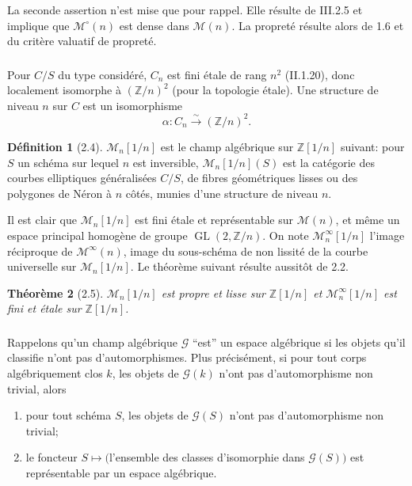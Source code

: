 \documentclass[11pt,a4paper]{amsart}
\theoremstyle{plain}
\newtheorem{theorem}{Th\'eor\`eme}[section]
\theoremstyle{definition}
\newtheorem{definition}[theorem]{D\'efinition}
\DeclareMathOperator{\Gl}{GL}
\newcommand{\CG}{\mathcal{G}}
\newcommand{\CM}{\mathcal{M}}
\newcommand{\mll}{\mathcal{M}}
\newcommand{\ZZ}{\mathbb{Z}}
\begin{document}
La seconde assertion n'est mise que pour rappel. Elle r\'esulte de III.2.5 et implique que $\mll^{\circ}(n)$ est dense dans $\mll(n)$. La propret\'e r\'esulte alors de 1.6 et du crit\`ere valuatif de propret\'e.

\subsubsection{}
Pour $C/S$ du type consid\'er\'e, $C_n$ est fini \'etale de rang $n^2$ (II.1.20), donc localement isomorphe \`a $(\ZZ/n)^2$ (pour la topologie \'etale). Une structure de niveau $n$ sur $C$ est un isomorphisme
\[
\alpha \colon C_n \xrightarrow{\sim} (\ZZ/n)^2.
\]

\begin{definition}[2.4]
$\mll_n[1/n]$ est le champ alg\'ebrique sur $\ZZ[1/n]$ suivant: pour $S$ un sch\'ema sur lequel $n$ est inversible, $\mll_n[1/n](S)$ est la cat\'egorie des courbes elliptiques g\'en\'eralis\'ees $C/S$, de fibres g\'eom\'etriques lisses ou des polygones de N\'eron \`a $n$ c\^ot\'es, munies d'une structure de niveau $n$.
\end{definition}

Il est clair que $\mll_n[1/n]$ est fini \'etale et repr\'esentable sur $\mll(n)$, et m\^eme un espace principal homog\`ene de groupe $\Gl(2, \ZZ/n)$. On note $\mll^{\infty}_n[1/n]$ l'image r\'eciproque de $\mll^{\infty}(n)$, image du sous-sch\'ema de non lissit\'e de la courbe universelle sur $\mll_n[1/n]$. Le th\'eor\`eme suivant r\'esulte aussit\^ot de 2.2.

\begin{theorem}[2.5]
$\CM_n[1/n]$ est propre et lisse sur $\ZZ[1/n]$ et $\mll^{\infty}_n[1/n]$ est fini et \'etale sur $\ZZ[1/n]$.
\end{theorem}

\subsubsection{}
Rappelons qu'un champ alg\'ebrique $\CG$ ``est'' un espace alg\'ebrique si les objets qu'il classifie n'ont pas d'automorphismes. Plus pr\'ecis\'ement, si pour tout corps alg\'ebriquement clos $k$, les objets de $\CG(k)$ n'ont pas d'automorphisme non trivial, alors
\begin{enumerate}[label=\alph*)]
\item pour tout sch\'ema $S$, les objets de $\CG(S)$ n'ont pas d'automorphisme non trivial;
\item le foncteur $S \mapsto ($l'ensemble des classes d'isomorphie dans $\CG(S))$ est repr\'esentable par un espace alg\'ebrique.
\end{enumerate}
\end{document}
